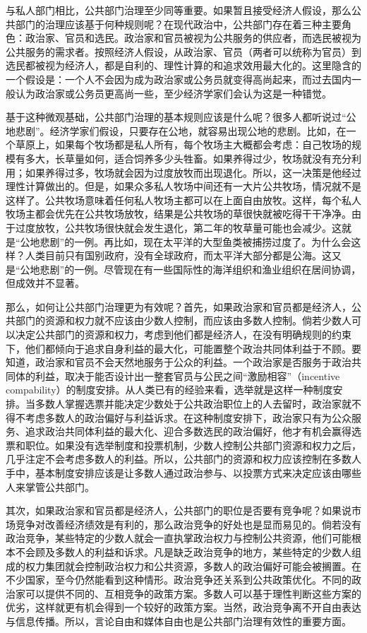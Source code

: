 
与私人部门相比，公共部门治理至少同等重要。如果暂且接受经济人假设，那么公共部门的治理应该基于何种规则呢？在现代政治中，公共部门存在着三种主要角色：政治家、官员和选民。政治家和官员被视为公共服务的供应者，而选民被视为公共服务的需求者。按照经济人假设，从政治家、官员（两者可以统称为官员）到选民都被视为经济人，都是自利的、理性计算的和追求效用最大化的。这里隐含的一个假设是：一个人不会因为成为政治家或公务员就变得高尚起来，而过去国内一般认为政治家或公务员更高尚一些，至少经济学家们会认为这是一种错觉。

基于这种微观基础，公共部门治理的基本规则应该是什么呢？很多人都听说过“公地悲剧”。经济学家们假设，只要存在公地，就容易出现公地的悲剧。比如，在一个草原上，如果每个牧场都是私人所有，每个牧场主大概都会考虑：自己牧场的规模有多大，长草量如何，适合饲养多少头牲畜。如果养得过少，牧场就没有充分利用；如果养得过多，牧场就会因为过度放牧而出现退化。所以，这一决策是他经过理性计算做出的。但是，如果众多私人牧场中间还有一大片公共牧场，情况就不是这样了。公共牧场意味着任何私人牧场主都可以在上面自由放牧。这样，每个私人牧场主都会优先在公共牧场放牧，结果是公共牧场的草很快就被吃得干干净净。由于过度放牧，公共牧场很快就会发生退化，第二年的牧草量可能也会减少。这就是“公地悲剧”的一例。再比如，现在太平洋的大型鱼类被捕捞过度了。为什么会这样？人类目前只有国别政府，没有全球政府，而太平洋大部分都是公海。这又是“公地悲剧”的一例。尽管现在有一些国际性的海洋组织和渔业组织在居间协调，但成效并不显著。

那么，如何让公共部门治理更为有效呢？首先，如果政治家和官员都是经济人，公共部门的资源和权力就不应该由少数人控制，而应该由多数人控制。倘若少数人可以决定公共部门的资源和权力，考虑到他们都是经济人，在没有明确规则的约束下，他们都倾向于追求自身利益的最大化，可能置整个政治共同体利益于不顾。要知道，政治家和官员不会天然地服务于公众的利益。一个政治家是否服务于政治共同体的利益，取决于能否设计出一整套官员与公民之间“激励相容”（incentive compability）的制度安排。从人类已有的经验来看，选举就是这样一种制度安排。当多数人掌握选票并能决定少数处于公共政治职位上的人去留时，政治家就不得不考虑多数人的政治偏好与利益诉求。在这种制度安排下，政治家只有为公众服务、追求政治共同体利益的最大化、迎合多数选民的政治偏好，他才有机会赢得选票和职位。如果没有选举制度和投票机制，少数人控制公共部门资源和权力之后，几乎注定不会考虑多数人的利益。所以，公共部门的资源和权力应该控制在多数人手中，基本制度安排应该是让多数人通过政治参与、以投票方式来决定应该由哪些人来掌管公共部门。

其次，如果政治家和官员都是经济人，公共部门的职位是否要有竞争呢？如果说市场竞争对改善经济绩效是有利的，那么政治竞争的好处也是显而易见的。倘若没有政治竞争，某些特定的少数人就会一直执掌政治权力与控制公共资源，他们可能根本不会顾及多数人的利益和诉求。凡是缺乏政治竞争的地方，某些特定的少数人组成的权力集团就会控制政治权力和公共资源，多数人的政治偏好可能会被搁置。在不少国家，至今仍然能看到这种情形。政治竞争还关系到公共政策优化。不同的政治家可以提供不同的、互相竞争的政策方案。多数人可以基于理性判断这些方案的优劣，这样就更有机会得到一个较好的政策方案。当然，政治竞争离不开自由表达与信息传播。所以，言论自由和媒体自由也是公共部门治理有效性的重要方面。

